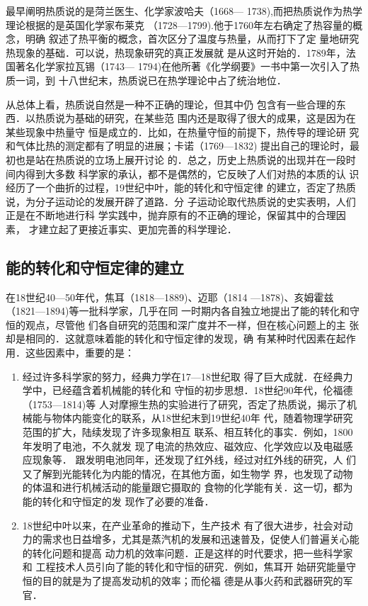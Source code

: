 最早阐明热质说的是菏兰医生、化学家波哈夫（1668—
1738),而把热质说作为热学理论根据的是英国化学家布莱克
（1728—1799).他于1760年左右确定了热容量的概念，明确
叙述了热平衡的概念，首次区分了温度与热量，从而打下了定
量地研究热现象的基础．可以说，热现象研究的真正发展就
是从这时开始的．1789年，法国著名化学家拉瓦锡（1743—
1794)在他所著《化学纲要》一书中第一次引入了热质一词，到
十八世纪末，热质说已在热学理论中占了统治地位．

从总体上看，热质说自然是一种不正确的理论，但其中仍
包含有一些合理的东西．以热质说为基础的研究，在某些范
围内还是取得了很大的成果，这是因为在某些现象中热量守
恒是成立的．比如，在热量守恒的前提下，热传导的理论研
究和气体比热的测定都有了明显的进展；卡诺（1769—1832)
提出自己的理论时，最初也是站在热质说的立场上展开讨论
的．总之，历史上热质说的出现并在一段时间内得到大多数
科学家的承认，都不是偶然的，它反映了人们对热的本质的认
识经历了一个曲折的过程，19世纪中叶，能的转化和守恒定律
的建立，否定了热质说，为分子运动论的发展开辟了道路．分
子运动论取代热质说的史实表明，人们正是在不断地进行科
学实践中，抛弃原有的不正确的理论，保留其中的合理因素，
才建立起了更接近事实、更加完善的科学理论．

\subsection{能的转化和守恒定律的建立}
在18世纪40—50年代，焦耳（1818—1889)、迈耶（1814
—1878)、亥姆霍兹（1821—1894)等一批科学家，几乎在同
一时期内各自独立地提出了能的转化和守恒的观点，尽管他
们各自研究的范围和深广度并不一样，但在核心问题上的主
张却是相同的．这就意味着能的转化和守恒定律的发现，确
有某种时代因素在起作用．这些因素中，重要的是：
\begin{enumerate}
    \item 经过许多科学家的努力，经典力学在17—18世纪取
得了巨大成就．在经典力学中，已经蕴含着机械能的转化和
守恒的初步思想．18世纪90年代，伦福德（1753—1814)等
人对摩擦生热的实验进行了研究，否定了热质说，揭示了机
械能与物体内能变化的联系，从18世纪末到19世纪40年
代，随着物理学研究范围的扩大，陆续发现了许多现象相互
联系、相互转化的事实．例如，1800年发明了电池，不久就发
现了电流的热效应、磁效应、化学效应以及电磁感应现象等．
跟发明电池同年，还发现了红外线，经过对红外线的研究，人
们又了解到光能转化为内能的情况，在其他方面，如生物学
界，也发现了动物的体温和进行机械活动的能量跟它摄取的
食物的化学能有关．这一切，都为能的转化和守恒定的发
现作了必要的准备．
\item 18世纪中叶以来，在产业革命的推动下，生产技术
有了很大进步，社会对动力的需求也日益增多，尤其是蒸汽机的发展和迅速普及，促使人们普遍关心能的转化问题和提高
动力机的效率问题．正是这样的时代要求，把一些科学家和
工程技术人员引向了能的转化和守恒的研究．例如，焦耳开
始研究能量守恒的目的就是为了提高发动机的效率；而伦福
德是从事火药和武器研究的军官．
\end{enumerate}

